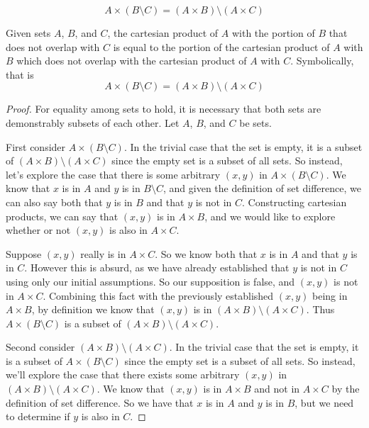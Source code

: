 \documentclass[main.tex]{subfiles}
\begin{document}
\subproblem{}\label{2o}
\[A \times (B \setminus C) = (A \times B) \setminus (A \times C)\]
\begin{thm}
	Given sets \(A\), \(B\), and \(C\), the cartesian product of \(A\) with
	the portion of \(B\) that does not overlap with \(C\) is equal to the
	portion of the cartesian product of \(A\) with \(B\) which does not
	overlap with the cartesian product of \(A\) with \(C\). Symbolically,
	that is
	\[A \times (B \setminus C) = (A \times B) \setminus (A \times C)\]
\end{thm}
\begin{proof}
	For equality among sets to hold, it is necessary that both sets are
	demonstrably subsets of each other. Let \(A\), \(B\), and \(C\) be sets.

	\medskip
	First consider \(A \times (B \setminus C)\). In the trivial case that
	the set is empty, it is a subset of
	\((A \times B) \setminus (A \times C)\) since the empty set is a subset
	of all sets. So instead, let's explore the case that there is some
	arbitrary \((x,y)\) in \(A \times (B \setminus C)\). We know that \(x\)
	is in \(A\) and \(y\) is in \(B \setminus C\), and given the definition
	of set difference, we can also say both that \(y\) is in \(B\) and that
	\(y\) is not in \(C\). Constructing cartesian products, we can say that
	\((x,y)\) is in \(A \times B\), and we would like to explore whether or
	not \((x,y)\) is also in \(A \times C\).

	Suppose \((x,y)\) really is in \(A \times C\). So we know both that
	\(x\) is in \(A\) and that \(y\) is in \(C\). However this is absurd, as
	we have already established that \(y\) is not in \(C\) using only our
	initial assumptions. So our supposition is false, and \((x,y)\) is not
	in \(A \times C\). Combining this fact with the previously established
	\((x,y)\) being in \(A \times B\), by definition we know that \((x,y)\)
	is in \((A \times B) \setminus (A \times C)\). Thus
	\(A \times (B \setminus C)\) is a subset of
	\((A \times B) \setminus (A \times C)\).

	\medskip
	Second consider \((A \times B) \setminus (A \times C)\). In the trivial
	case that the set is empty, it is a subset of
	\(A \times (B \setminus C)\) since the empty set is a subset of all
	sets. So instead, we'll explore the case that there exists some
	arbitrary \((x,y)\) in \((A \times B) \setminus (A \times C)\). We know
	that \((x,y)\) is in \(A \times B\) and not in \(A \times C\) by the
	definition of set difference. So we have that \(x\) is in \(A\) and
	\(y\) is in \(B\), but we need to determine if \(y\) is also in \(C\).


\end{proof}
\end{document}
